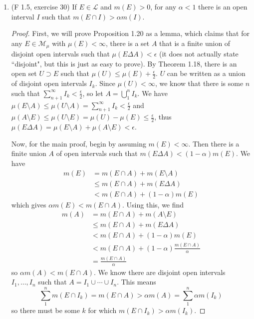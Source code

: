 \documentclass[10pt]{article}
\newcommand{\M}{\mathcal{M}}
\renewcommand{\L}{\mathcal{L}}
\newcommand{\sd}{\Delta}
\begin{document}
\begin{enumerate}
\begin{proof}
$A_m$ is a disjoint union of $2^{m-1}$ intervals, and we have just shown that each of these contains $2^{n-m-1}$ intervals from $A_n$.  Each interval in $A_n$ has measure $2^{-n}$.  Therefore
$$
\mu(A_n \cap A_m) = 2^{m-1}\cdot 2^{n-m-1} \cdot 2^{-n} = \frac14 = \frac12 \cdot \frac12 = \mu(A_n)\mu(A_m).
$$
Finally, we have $\mu(A_n \sd A_m) = \mu(A_n) + \mu(A_m) - 2\mu(A_n \cap A_m) = \frac12 > 0$.
\end{proof}

\item (F 1.5, exercise 30) If $E \in \L$ and $m(E) > 0$, for any $\alpha < 1$ there is an open interval $I$ such that $m(E \cap I) > \alpha m(I)$.

\begin{proof}

First, we will prove Proposition 1.20 as a lemma, which claims that for any $E \in \M_{\mu}$ with $\mu (E) < \infty$, there is a set $A$ that is a finite union of disjoint open intervals such that $\mu(E \sd A) < \epsilon$ (it does not actually state ``disjoint", but this is just as easy to prove).  By Theorem 1.18, there is an open set $U \supset E$ such that $\mu(U) \leq \mu(E) + \frac{\epsilon}{2}$.  $U$ can be written as a union of disjoint open intervals $I_k$.  Since $\mu(U) < \infty$, we know that there is some $n$ such that $\sum\limits_{n+1}^\infty I_k < \frac{\epsilon}{2}$, so let $A = \bigcup\limits_{1}^n I_k$.  We have $\mu(E \setminus A) \leq \mu(U \setminus A) = \sum\limits_{n+1}^\infty I_k < \frac{\epsilon}{2}$ and $\mu(A \setminus E) \leq \mu(U \setminus E) = \mu(U) - \mu(E) \leq \frac{\epsilon}{2}$, thus $\mu(E \sd A) = \mu(E \setminus A) + \mu (A \setminus E) < \epsilon$.

Now, for the main proof, begin by assuming $m(E) < \infty$.  Then there is a finite union $A$ of open intervals such that $m(E \sd A) < (1-\alpha)m(E)$.  We have
\begin{align*}
m(E) &= m(E \cap A) + m(E \setminus A) \\
&\leq m(E \cap A) + m(E \sd A) \\
&< m(E \cap A) + (1-\alpha)m(E)
\end{align*}
which gives $\alpha m(E) < m(E \cap A)$.  Using this, we find
\begin{align*}
m(A) &= m(E \cap A) + m(A \setminus E) \\
&\leq m(E \cap A) + m(E \sd A) \\
&< m(E \cap A) + (1-\alpha)m(E) \\
&< m(E \cap A) + (1-\alpha)\frac{m(E\cap A)}{\alpha}\\
&= \frac{m(E\cap A)}{\alpha}
\end{align*}
so $\alpha m(A) < m(E \cap A)$.  We know there are disjoint open intervals $I_1, \dots , I_n$ such that $A = I_1 \cup \cdots \cup I_n$.  This means
$$
\sum_1^n m(E \cap I_k) = m(E \cap A) > \alpha m(A) = \sum_1^n \alpha m(I_k)
$$
so there must be some $k$ for which $m(E \cap I_k) > \alpha m(I_k)$.


\end{proof}
\end{enumerate}
\end{document}
